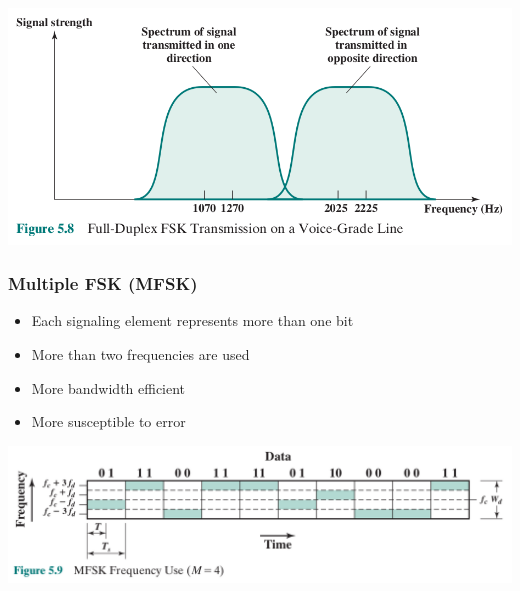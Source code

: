 \documentclass[pdflatex,compress]{beamer}
\begin{document}
\begin{frame}
	\begin{center}
		\includegraphics[width=\linewidth]{img/img12}
	\end{center}
\end{frame}

\begin{frame}
	\frametitle{Multiple FSK (MFSK)}
	\begin{itemize}
		\item Each signaling element represents more than one bit
		\item More than two frequencies are used
		\item More bandwidth efficient
		\item More susceptible to error
	\end{itemize}
\end{frame}

\begin{frame}
	\begin{center}
		\includegraphics[width=\linewidth]{img/img13}
	\end{center}
\end{frame}

\end{document}
